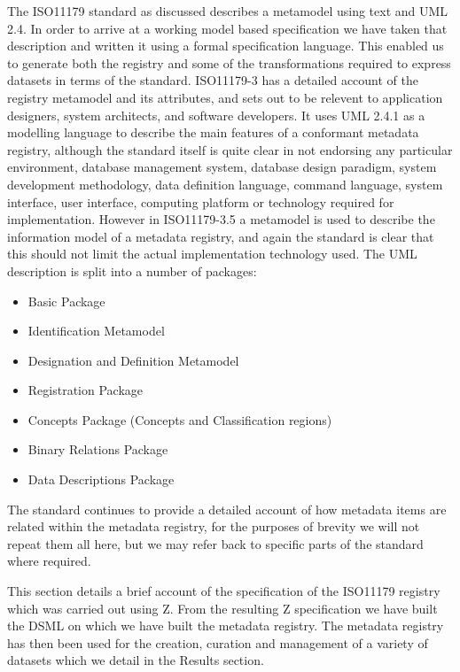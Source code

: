 \documentclass{llncs}
\begin{document}
The ISO11179 standard as discussed describes a metamodel using text and UML 2.4. In order to arrive at a working model based specification we have taken that description and written it using a formal specification language.  This enabled us to generate both the registry and some of the transformations required to express datasets in terms of the standard.  ISO11179-3 has a detailed account of the registry metamodel and its attributes, and sets out to be relevent to application designers, system architects, and software developers. It uses UML 2.4.1 as a modelling language to describe the main features of a conformant metadata registry, although the standard itself is quite clear in not endorsing any particular environment, database management system, database design paradigm, system development methodology, data definition language, command language, system interface, user interface, computing platform or technology required for implementation. However in ISO11179-3.5 a metamodel is used to describe the information model of a metadata registry, and again the standard is clear that this should not limit the actual implementation technology used. The UML description is split into a number of packages:
\begin{itemize}
\item Basic Package
\item Identification Metamodel
\item Designation and Definition Metamodel
\item Registration Package
\item Concepts Package (Concepts and Classification regions)
\item Binary Relations Package
\item Data Descriptions Package
\end{itemize}

The standard continues to provide a detailed account of how metadata items are related within the metadata registry, for the purposes of brevity we will not repeat them all here, but we may refer back to specific parts of the standard where required.

This section details a brief account of the specification of the ISO11179 registry which was carried out using Z. From the resulting Z specification we have built the DSML on which we have built the metadata registry. The metadata registry has then been used for the creation, curation and management of a variety of datasets which we detail in the Results section. 
\end{document}
